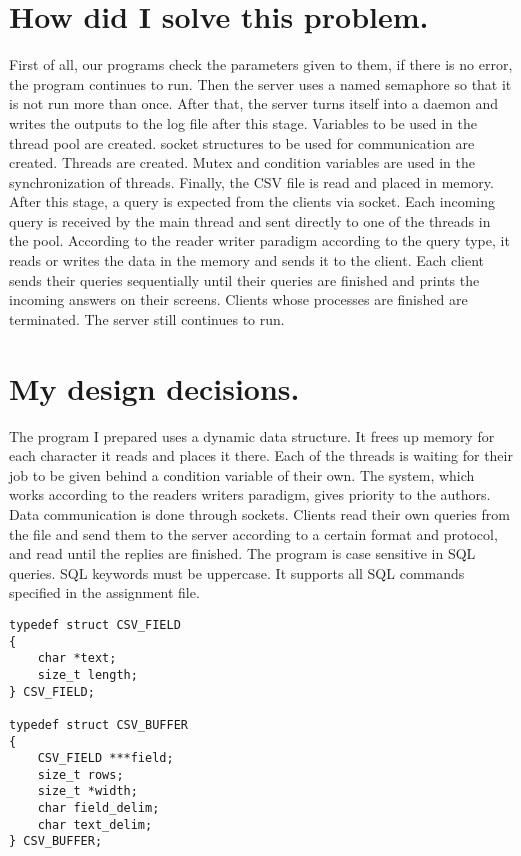 \documentclass{article}
\begin{document}
\section{How did I solve this problem.}
\quad First of all, our programs check the parameters given to them, if there is no error, the program continues to run. Then the server uses a named semaphore so that it is not run more than once. After that, the server turns itself into a daemon and writes the outputs to the log file after this stage. Variables to be used in the thread pool are created. socket structures to be used for communication are created. Threads are created. Mutex and condition variables are used in the synchronization of threads. Finally, the CSV file is read and placed in memory. After this stage, a query is expected from the clients via socket. Each incoming query is received by the main thread and sent directly to one of the threads in the pool. According to the reader writer paradigm according to the query type, it reads or writes the data in the memory and sends it to the client.
 Each client sends their queries sequentially until their queries are finished and prints the incoming answers on their screens. Clients whose processes are finished are terminated. The server still continues to run.
\\


\section{My design decisions.}
 \quad The program I prepared uses a dynamic data structure. It frees up memory for each character it reads and places it there. Each of the threads is waiting for their job to be given behind a condition variable of their own. The system, which works according to the readers writers paradigm, gives priority to the authors. Data communication is done through sockets. Clients read their own queries from the file and send them to the server according to a certain format and protocol, and read until the replies are finished. The program is case sensitive in SQL queries. SQL keywords must be uppercase. It supports all SQL commands specified in the assignment file.\\
 
\begin{verbatim}
typedef struct CSV_FIELD
{
	char *text;
	size_t length;
} CSV_FIELD;

typedef struct CSV_BUFFER
{
	CSV_FIELD ***field;
	size_t rows;
	size_t *width;
	char field_delim;
	char text_delim;
} CSV_BUFFER;
\end{verbatim}
\end{document}
